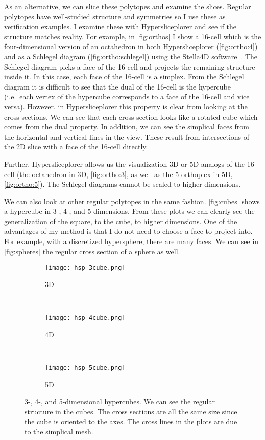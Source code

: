 As an alternative, we can slice these polytopes and examine the slices.
Regular polytopes have well-studied structure and symmetries so I use these as
verification examples. I examine these with Hypersliceplorer and see if the
structure matches reality.  For example, in \autoref{fig:orthos} I show a
16-cell which is the four-dimensional version of an octahedron in both
Hypersliceplorer (\autoref{fig:ortho:4}) and as a Schlegel diagram (\autoref{fig:ortho:schlegel})
using the Stella4D software~\cite{Stella4D}. The
Schlegel diagram picks a face of the 16-cell and projects the remaining
structure inside it. In this case, each face of the 16-cell is a simplex. From
the Schlegel diagram it is difficult to see that the dual of the 16-cell is the
hypercube (i.e.\ each vertex of the hypercube corresponds to a face of the 16-cell and vice
versa). However, in Hypersliceplorer this property is clear from looking at the
cross sections. We can see that each cross section looks like a rotated cube
which comes from the dual property. In addition, we can see the simplical faces
from the horizontal and vertical lines in the view. These result from intersections of the
2D slice with a face of the 16-cell directly.

Further, Hypersliceplorer allows us the visualization 3D or 5D analogs of the 16-cell (the octahedron in 3D, \autoref{fig:ortho:3}, as well as the 5-orthoplex in 5D, \autoref{fig:ortho:5}). The Schlegel diagrams cannot be scaled to higher dimensions.

We can also look at other regular polytopes in the same fashion. 
\autoref{fig:cubes} shows a hypercube in 3-, 4-, and 5-dimensions. From these
plots we can clearly see the generalization of the square, to the cube, to
higher dimensions. One of the advantages of my method is that I do not need
to choose a face to project into. For example, with a discretized hypersphere,
there are many faces. We can see in \autoref{fig:spheres} the regular cross
section of a sphere as well. 

\begin{figure} 
  \centering
  \begin{subfigure}[b]{0.3\linewidth}
    \texttt{[image: hsp\_3cube.png]}
    \caption{3D}
    \label{fig:cubes:3d} 
  \end{subfigure} 
  ~
  \begin{subfigure}[b]{0.3\linewidth}
    \texttt{[image: hsp\_4cube.png]}
    \caption{4D}
    \label{fig:cubes:4d} 
  \end{subfigure}
  ~
  \begin{subfigure}[b]{0.3\linewidth}
    \texttt{[image: hsp\_5cube.png]}
    \caption{5D}
    \label{fig:cubes:5d} 
  \end{subfigure}
  \caption{%
    3-, 4-, and 5-dimensional hypercubes. We can see the regular structure
    in the cubes. The cross sections are all the same size since the cube
    is oriented to the axes. The cross lines in the plots are due to the 
    simplical mesh.
  } 
  \label{fig:cubes} 
\end{figure}

